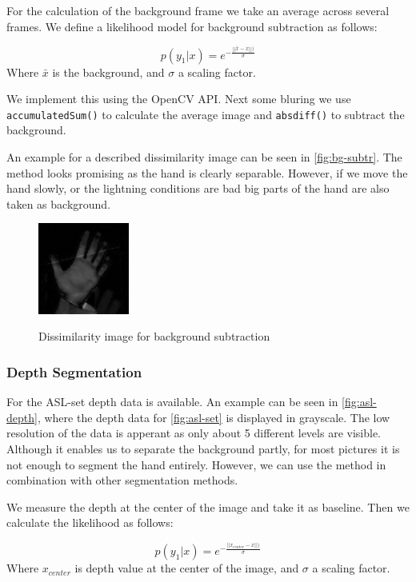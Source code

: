 \documentclass[letterpaper, 10 pt, conference]{ieeeconf}  %
\begin{document}
For the calculation of the background frame we take an average across several frames. We define a likelihood model for background subtraction as follows:

\begin{equation}
p(y_1 | x) = e^{-\frac{||\bar{x}-x||)}{\sigma}}
\label{eq:backg}
\end{equation}
Where $\bar{x}$ is the background, and $\sigma$ a scaling factor.

We implement this using the OpenCV API. Next some bluring we use \texttt{accumulatedSum()} to calculate the average image and \texttt{absdiff()} to subtract the background.

An example for a described dissimilarity image can be seen in \autoref{fig:bg-subtr}. The method looks promising as the hand is clearly separable. However, if we move the hand slowly, or the lightning conditions are bad big parts of the hand are also taken as background.

\begin{figure}
	\centering
	\includegraphics[height=3cm]{bg-subtr}
	\label{fig:tm-segment}
	\caption{Dissimilarity image for background subtraction}
\end{figure}

\subsubsection{Depth Segmentation}

For the ASL-set depth data is available. An example can be seen in \autoref{fig:asl-depth}, where the depth data for \autoref{fig:asl-set} is displayed in grayscale. The low resolution of the data is apperant as only about 5 different levels are visible. Although it enables us to separate the background partly, for most pictures it is not enough to segment the hand entirely. However, we can use the method in combination with other segmentation methods.

We measure the depth at the center of the image and take it as baseline. Then we calculate the likelihood as follows:

\begin{equation}
p(y_1 | x) = e^{-\frac{||x_{center}-x||)}{\sigma}}
\label{eq:backg}
\end{equation}
Where $x_ {center}$ is depth value at the center of the image, and $\sigma$ a scaling factor.
\end{document}
